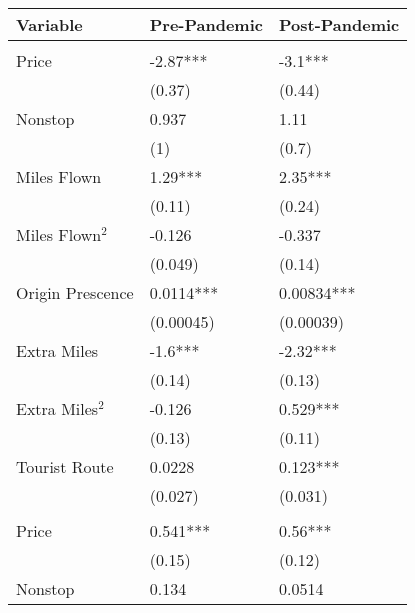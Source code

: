 
\begin{tabular}[t]{lll}
\toprule
Variable & Pre-Pandemic & Post-Pandemic\\
\midrule
\addlinespace[0.3em]
\multicolumn{3}{l}{\textbf{Linear Coefficients}}\\
\hspace{1em}Price & -2.87*** & -3.1***\\
\hspace{1em} & (0.37) & (0.44)\\
\hspace{1em}Nonstop & 0.937 & 1.11\\
\hspace{1em} & (1) & (0.7)\\
\hspace{1em}Miles Flown & 1.29*** & 2.35***\\
\hspace{1em} & (0.11) & (0.24)\\
\hspace{1em}Miles Flown$^2$ & -0.126 & -0.337\\
\hspace{1em} & (0.049) & (0.14)\\
\hspace{1em}Origin Prescence & 0.0114*** & 0.00834***\\
\hspace{1em} & (0.00045) & (0.00039)\\
\hspace{1em}Extra Miles & -1.6*** & -2.32***\\
\hspace{1em} & (0.14) & (0.13)\\
\hspace{1em}Extra Miles$^2$ & -0.126 & 0.529***\\
\hspace{1em} & (0.13) & (0.11)\\
\hspace{1em}Tourist Route & 0.0228 & 0.123***\\
\hspace{1em} & (0.027) & (0.031)\\
\midrule
\addlinespace[0.3em]
\multicolumn{3}{l}{\textbf{Nonlinear Coefficients}}\\
\hspace{1em}Price & 0.541*** & 0.56***\\
\hspace{1em} & (0.15) & (0.12)\\
\hspace{1em}Nonstop & 0.134 & 0.0514\\

\end{tabular}

